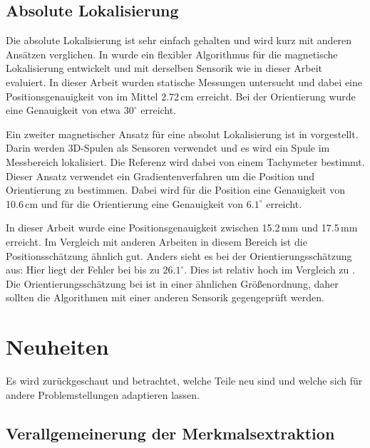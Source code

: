 \subsection{Absolute Lokalisierung}
Die absolute Lokalisierung ist sehr einfach gehalten und wird kurz mit anderen Ansätzen verglichen. In \cite{bald_echtzeitlokalisierung_2024} wurde ein flexibler Algorithmus für die magnetische Lokalisierung entwickelt und mit derselben Sensorik wie in dieser Arbeit evaluiert. In dieser Arbeit wurden statische Messungen untersucht und dabei eine Positionsgenauigkeit von im Mittel 2.72\,cm erreicht. Bei der Orientierung wurde eine Genauigkeit von etwa $30^\circ$ erreicht.

Ein zweiter magnetischer Ansatz für eine absolut Lokalisierung ist in \cite{hehn_high-accuracy_2019} vorgestellt. Darin werden 3D-Spulen als Sensoren verwendet und es wird ein Spule im Messbereich lokalisiert. Die Referenz wird dabei von einem Tachymeter bestimmt. Dieser Ansatz verwendet ein Gradientenverfahren um die Position und Orientierung zu bestimmen. Dabei wird für die Position eine Genauigkeit von 10.6\,cm und für die Orientierung eine Genauigkeit von $6.1^\circ$ erreicht.

In dieser Arbeit wurde eine Positionsgenauigkeit zwischen 15.2\,mm und 17.5\,mm erreicht. Im Vergleich mit anderen Arbeiten in diesem Bereich ist die Positionsschätzung ähnlich gut. Anders sieht es bei der Orientierungsschätzung aus: Hier liegt der Fehler bei bis zu $26.1^\circ$. Dies ist relativ hoch im Vergleich zu \cite{hehn_high-accuracy_2019}. Die Orientierungsschätzung bei \cite{bald_echtzeitlokalisierung_2024} ist in einer ähnlichen Größenordnung, daher sollten die Algorithmen mit einer anderen Sensorik gegengeprüft werden. 


\section{Neuheiten}
   Es wird zurückgeschaut und betrachtet, welche Teile neu sind und welche sich für andere Problemstellungen adaptieren lassen. 
   
   \subsection{Verallgemeinerung der Merkmalsextraktion}

